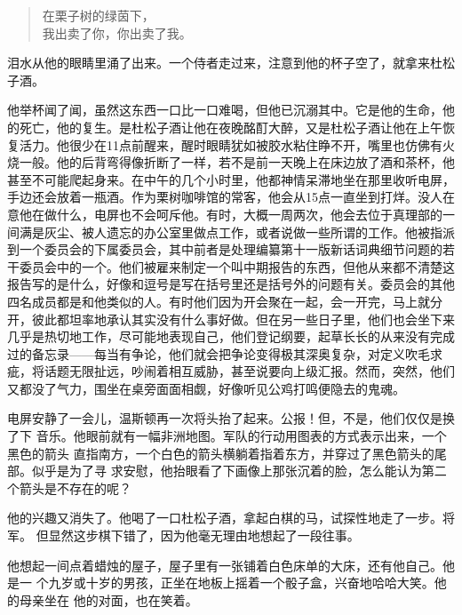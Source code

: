\begin{quotation}
\noindent 在栗子树的绿茵下，\\
我出卖了你，你出卖了我。
\end{quotation}


泪水从他的眼睛里涌了出来。一个侍者走过来，注意到他的杯子空了，就拿来杜松子酒。

他举杯闻了闻，虽然这东西一口比一口难喝，但他已沉溺其中。它是他的生命，他的死亡，他的复生。是杜松子酒让他在夜晚酩酊大醉，又是杜松子酒让他在上午恢复活力。他很少在11点前醒来，醒时眼睛犹如被胶水粘住睁不开，嘴里也仿佛有火烧一般。他的后背弯得像折断了一样，若不是前一天晚上在床边放了酒和茶杯，他甚至不可能爬起身来。在中午的几个小时里，他都神情呆滞地坐在那里收听电屏，手边还会放着一瓶酒。作为栗树咖啡馆的常客，他会从15点一直坐到打烊。没人在意他在做什么，电屏也不会呵斥他。有时，大概一周两次，他会去位于真理部的一间满是灰尘、被人遗忘的办公室里做点工作，或者说做一些所谓的工作。他被指派到一个委员会的下属委员会，其中前者是处理编纂第十一版新话词典细节问题的若干委员会中的一个。他们被雇来制定一个叫中期报告的东西，但他从来都不清楚这报告写的是什么，好像和逗号是写在括号里还是括号外的问题有关。委员会的其他四名成员都是和他类似的人。有时他们因为开会聚在一起，会一开完，马上就分开，彼此都坦率地承认其实没有什么事好做。但在另一些日子里，他们也会坐下来几乎是热切地工作，尽可能地表现自己，他们登记纲要，起草长长的从来没有完成过的备忘录——每当有争论，他们就会把争论变得极其深奥复杂，对定义吹毛求疵，将话题无限扯远，吵闹着相互威胁，甚至说要向上级汇报。然而，突然，他们又都没了气力，围坐在桌旁面面相觑，好像听见公鸡打鸣便隐去的鬼魂。

电屏安静了一会儿，温斯顿再一次将头抬了起来。公报！但，不是，他们仅仅是换了下
音乐。他眼前就有一幅非洲地图。军队的行动用图表的方式表示出来，一个黑色的箭头
直指南方，一个白色的箭头横躺着指着东方，并穿过了黑色箭头的尾部。似乎是为了寻
求安慰，他抬眼看了下画像上那张沉着的脸，怎么能认为第二个箭头是不存在的呢？

他的兴趣又消失了。他喝了一口杜松子酒，拿起白棋的马，试探性地走了一步。将军。
但显然这步棋下错了，因为他毫无理由地想起了一段往事。

他想起一间点着蜡烛的屋子，屋子里有一张铺着白色床单的大床，还有他自己。他是一
个九岁或十岁的男孩，正坐在地板上摇着一个骰子盒，兴奋地哈哈大笑。他的母亲坐在
他的对面，也在笑着。

